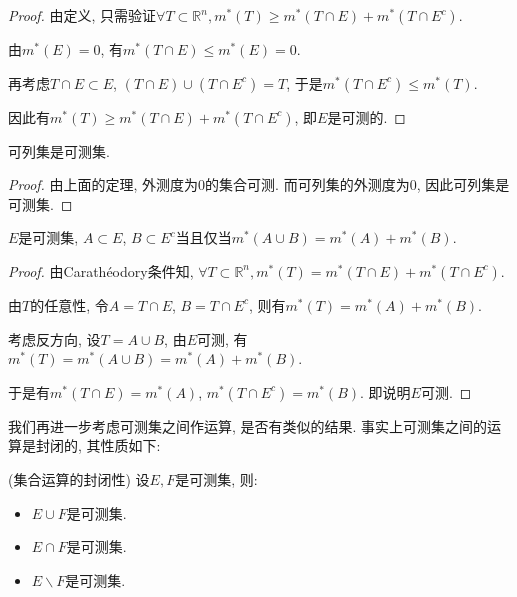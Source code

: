 \documentclass[theorem=false,mathfont=none,openany,sub3section]{easybook}
\begin{document}
\begin{proof}
  由定义, 只需验证$\forall T\subset \mathbb{R}^n, m^{*}(T)\geqslant m^{*}(T\cap E)+m^{*}(T\cap E^c)$.\par
  由$m^{*}(E)=0$, 有$m^{*}(T\cap E)\leqslant m^{*}(E)=0$.\par
  再考虑$T\cap E\subset E$, $(T\cap E)\cup (T\cap E^c)=T$, 于是$m^{*}(T\cap E^c)\leqslant m^{*}(T)$.\par
  因此有$m^{*}(T)\geqslant m^{*}(T\cap E)+m^{*}(T\cap E^c)$, 即$E$是可测的.\par
\end{proof}

\begin{corollary}
  可列集是可测集.\par
\end{corollary}

\begin{proof}
  由上面的定理, 外测度为0的集合可测. 而可列集的外测度为0, 因此可列集是可测集.\par
\end{proof}

\begin{theorem}
  $E$是可测集, $A\subset E$, $B\subset E^c$当且仅当$m^{*}(A\cup B)=m^{*}(A)+m^{*}(B)$.\par
\end{theorem}

\begin{proof}
  由Carathéodory条件知, $\forall T\subset \mathbb{R}^n, m^{*}(T)=m^{*}(T\cap E)+m^{*}(T\cap E^c)$.\par
  由$T$的任意性, 令$A=T\cap E$, $B=T\cap E^c$, 则有$m^{*}(T)=m^{*}(A)+m^{*}(B)$.\par
  考虑反方向, 设$T=A\cup B$, 由$E$可测, 有$m^{*}(T)=m^{*}(A\cup B)=m^{*}(A)+m^{*}(B)$.\par
  于是有$m^{*}(T\cap E)=m^{*}(A)$, $m^{*}(T\cap E^c)=m^{*}(B)$. 即说明$E$可测.\par
\end{proof}

我们再进一步考虑可测集之间作运算, 是否有类似的结果. 事实上可测集之间的运算是封闭的, 其性质如下:\par

\begin{proposition}
  (集合运算的封闭性) 设$E,F$是可测集, 则:\par
  \begin{itemize}
    \item $E\cup F$是可测集.
    \item $E\cap F$是可测集.
    \item $E\backslash F$是可测集.
  \end{itemize}
\end{proposition}
\end{document}
